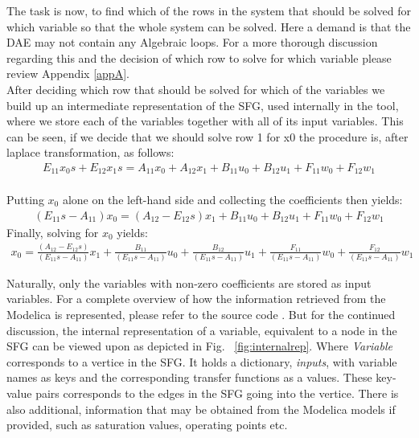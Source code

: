 \begin{mydef}
%
The task is now, to find which of the rows in the system that should be solved for which variable so that the whole system can be solved. Here a demand is that the DAE may not contain any Algebraic loops. For a more thorough discussion regarding this and the decision of which row to solve for which variable please review Appendix \ref{appA}.\\\newline After deciding which row that should be solved for which of the variables we build up an intermediate representation of the SFG, used internally in the tool, where we store each of the variables together with all of its input variables. This can be seen, if we decide that we should solve row 1 for x0 the procedure is, after laplace transformation, as follows:
%
\begin{equation}
\begin{array}{rcl} E_{11}x_0s  +E_{12}x_1s=A_{11}x_0  +A_{12}x_1 +B_{11}u_0  +B_{12}u_1  +F_{11}w_0  +F_{12}w_1 
\end{array}
\end{equation}\\
%
Putting $x_0$ alone on the left-hand side and collecting the coefficients then yields:%
\begin{equation}
\begin{array}{rcl} (E_{11}s-A_{11})x_0  =(A_{12}-E_{12}s)x_1 +B_{11}u_0  +B_{12}u_1 +F_{11}w_0  +F_{12}w_1 
\end{array}
\end{equation}
%
Finally, solving for $x_0$ yields:%
\begin{equation}
\begin{array}{rcl} x_0  = \frac{(A_{12}-E_{12}s)}{(E_{11}s-A_{11})}x_1 +\frac{B_{11}}{(E_{11}s-A_{11})}u_0  +\frac{B_{12}}{(E_{11}s-A_{11})}u_1 +\frac{F_{11}}{(E_{11}s-A_{11})}w_0 +\frac{F_{12}}{(E_{11}s-A_{11})}w_1
\end{array}
\end{equation}
\end{mydef}
Naturally, only the variables with non-zero coefficients are stored as input variables. For a complete overview of how the information retrieved from the Modelica is represented, please refer to the source code \cite{githabb}\nocite{*}. But for the continued discussion, the internal representation of a variable, equivalent to a node in the SFG can be viewed upon as depicted in Fig. ~\ref{fig:internalrep}. Where \textit{Variable} corresponds to a vertice in the SFG. It holds a dictionary, \textit{inputs}, with variable names as keys and the corresponding transfer functions as a values. These key-value pairs corresponds to the edges in the SFG going into the vertice. There is also additional, information that may be obtained from the Modelica models if provided, such as saturation values, operating points etc.%
